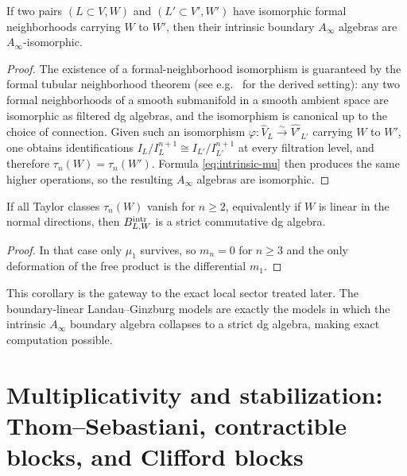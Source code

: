 \begin{corollary}\label{cor:formal-neighborhood}
If two pairs $(L\subset V,W)$ and $(L'\subset V',W')$ have isomorphic formal neighborhoods carrying $W$ to $W'$, then their intrinsic boundary $A_\infty$ algebras are $A_\infty$-isomorphic.
\end{corollary}

\begin{proof}
The existence of a formal-neighborhood isomorphism is guaranteed by the formal tubular neighborhood theorem (see e.g.\ \cite[{\S}II.4]{GR14} for the derived setting): any two formal neighborhoods of a smooth submanifold in a smooth ambient space are isomorphic as filtered dg algebras, and the isomorphism is canonical up to the choice of connection. Given such an isomorphism $\varphi\colon \widehat{V}_L\xrightarrow{\sim}\widehat{V'}_{L'}$ carrying $W$ to $W'$, one obtains identifications $I_L/I_L^{n+1}\cong I_{L'}/I_{L'}^{n+1}$ at every filtration level, and therefore $\tau_n(W)=\tau_n(W')$. Formula \eqref{eq:intrinsic-mu} then produces the same higher operations, so the resulting $A_\infty$ algebras are isomorphic.
\end{proof}

\begin{corollary}\label{cor:boundary-linear-strict}
If all Taylor classes $\tau_n(W)$ vanish for $n\ge 2$, equivalently if $W$ is linear in the normal directions, then $B^{\mathrm{intr}}_{L,W}$ is a strict commutative dg algebra.
\end{corollary}

\begin{proof}
In that case only $\mu_1$ survives, so $m_n=0$ for $n\ge 3$ and the only deformation of the free product is the differential $m_1$.
\end{proof}

\begin{remark}
This corollary is the gateway to the exact local sector treated later. The boundary-linear Landau--Ginzburg models are exactly the models in which the intrinsic $A_\infty$ boundary algebra collapses to a strict dg algebra, making exact computation possible.
\end{remark}


\section{Multiplicativity and stabilization: Thom--Sebastiani, contractible blocks, and Clifford blocks}\label{sec:ts-knorrer}

